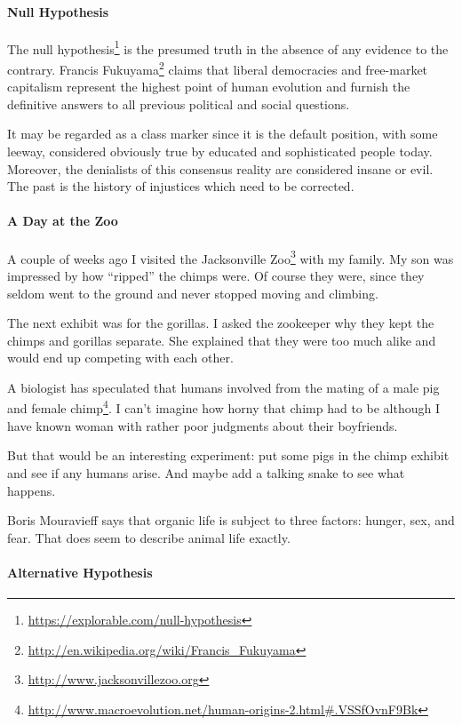 \paragraph{Null Hypothesis}


The null hypothesis\footnote{\url{https://explorable.com/null-hypothesis}} is the presumed truth in the absence of any evidence to the contrary. Francis Fukuyama\footnote{\url{http://en.wikipedia.org/wiki/Francis_Fukuyama}} claims that liberal democracies and free-market capitalism represent the highest point of human evolution and furnish the definitive answers to all previous political and social questions.

It may be regarded as a class marker since it is the default position, with some leeway, considered obviously true by educated and sophisticated people today. Moreover, the denialists of this consensus reality are considered insane or evil. The past is the history of injustices which need to be corrected.

\paragraph{A Day at the Zoo}


A couple of weeks ago I visited the Jacksonville Zoo\footnote{\url{http://www.jacksonvillezoo.org}} with my family. My son was impressed by how ``ripped'' the chimps were. Of course they were, since they seldom went to the ground and never stopped moving and climbing.

The next exhibit was for the gorillas. I asked the zookeeper why they kept the chimps and gorillas separate. She explained that they were too much alike and would end up competing with each other.

A biologist has speculated that humans involved from the mating of a male pig and female chimp\footnote{\url{http://www.macroevolution.net/human-origins-2.html\#.VSSfOvnF9Bk}}. I can't imagine how horny that chimp had to be although I have known woman with rather poor judgments about their boyfriends.

But that would be an interesting experiment: put some pigs in the chimp exhibit and see if any humans arise. And maybe add a talking snake to see what happens.

Boris Mouravieff says that organic life is subject to three factors: hunger, sex, and fear. That does seem to describe animal life exactly.

\paragraph{Alternative Hypothesis}


